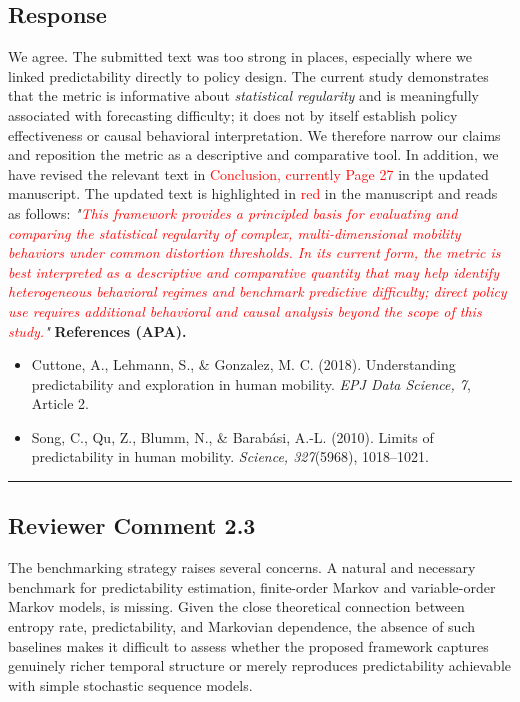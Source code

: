 \documentclass{NSF}
\begin{document}
\subsection{Response}
We agree. The submitted text was too strong in places, especially where we linked predictability directly to policy design. The current study demonstrates that the metric is informative about \emph{statistical regularity} and is meaningfully associated with forecasting difficulty; it does not by itself establish policy effectiveness or causal behavioral interpretation. We therefore narrow our claims and reposition the metric as a descriptive and comparative tool.
\noindent In addition, we have revised the relevant text in \textcolor{red}{Conclusion, currently Page 27} in the updated manuscript. The updated text is highlighted in \textcolor{red}{red} in the manuscript and reads as follows:
\vskip 0.1cm
\noindent \textit{"\textcolor{red}{This framework provides a principled basis for evaluating and comparing the statistical regularity of complex, multi-dimensional mobility behaviors under common distortion thresholds. In its current form, the metric is best interpreted as a descriptive and comparative quantity that may help identify heterogeneous behavioral regimes and benchmark predictive difficulty; direct policy use requires additional behavioral and causal analysis beyond the scope of this study.}"}
\vskip 0.05in
\noindent\textbf{References (APA).}
\begin{itemize}
    \item Cuttone, A., Lehmann, S., \& Gonzalez, M. C. (2018). Understanding predictability and exploration in human mobility. \textit{EPJ Data Science, 7}, Article 2.
    \item Song, C., Qu, Z., Blumm, N., \& Barab\'asi, A.-L. (2010). Limits of predictability in human mobility. \textit{Science, 327}(5968), 1018--1021.
\end{itemize}

\noindent\rule{16.5cm}{1.0pt}

\subsection{Reviewer Comment 2.3}
\begin{mdframed}
The benchmarking strategy raises several concerns. A natural and necessary benchmark for predictability estimation, finite-order Markov and variable-order Markov models, is missing. Given the close theoretical connection between entropy rate, predictability, and Markovian dependence, the absence of such baselines makes it difficult to assess whether the proposed framework captures genuinely richer temporal structure or merely reproduces predictability achievable with simple stochastic sequence models.
\end{mdframed}
\end{document}
